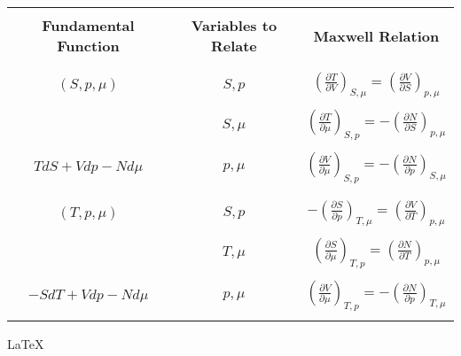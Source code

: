 \documentclass{article}
\begin{document}
 
 \newpage
 \begin{tabular}{|>{\Large\bfseries}c|>{\Large\bfseries}c|>{\Large\bfseries}c|}
    \hline
    & & \\
    \LARGE{Fundamental Function} & \LARGE{Variables to Relate} & \LARGE{Maxwell Relation} \\
    & & \\
    \hline
    & & \\
    $(S,p, \mu)$ & \normalfont $S,p$ & $(\frac{\partial T}{\partial V})_{S, \mu}=(\frac{\partial V}{\partial S})_{p,\mu}$ \\
    & & \\
    & \normalfont $S, \mu$ & $(\frac{\partial T}{\partial \mu})_{S,p}= -(\frac{\partial N}{\partial S})_{p, \mu}$ \\
    & & \\
    $TdS+Vdp-Nd\mu$ & $p,\mu$ & $(\frac{\partial V}{\partial \mu})_{S,p}= -(\frac{\partial N}{\partial p})_{S, \mu}$ \\
    & & \\
    \hline
    & & \\
    $(T,p, \mu)$ & $S,p$ & $-(\frac{\partial S}{\partial p})_{T,\mu}= (\frac{\partial V}{\partial T})_{p,\mu}$ \\
    & & \\
    & $T,\mu$ & $(\frac{\partial S}{\partial \mu })_{T,p}=(\frac{\partial N}{\partial T})_{p,\mu}$ \\
    & & \\
    $-SdT+Vdp-Nd\mu$ & $p,\mu$ & $(\frac{\partial V}{\partial \mu})_{T,p}= -(\frac{\partial N}{\partial p})_{T,\mu}$ \\
    & & \\
    \hline
\end{tabular}

\LaTeX 
  
\end{document}
